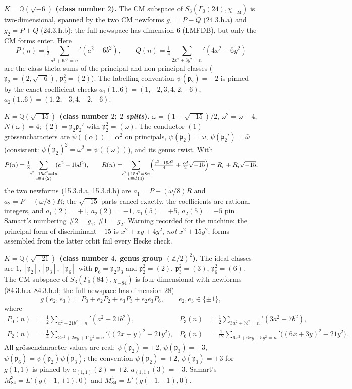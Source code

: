 \documentclass[11pt]{article}
\newcommand{\Qq}{\mathbb{Q}}
\newcommand{\Zz}{\mathbb{Z}}
\theoremstyle{definition}
\theoremstyle{remark}
\begin{document}
\textbf{$K=\Qq(\sqrt{-6})$ (class number $2$).}
The CM subspace of $S_3(\Gamma_0(24),\chi_{-24})$ is
two-dimensional, spanned by the two
CM newforms $g_1=P-Q$ (\textsf{24.3.h.a}) and $g_2=P+Q$
(\textsf{24.3.h.b}); the full newspace has dimension $6$
(LMFDB), but only the CM forms enter. Here
\[
  P(n)=\tfrac12{\sum_{a^2+6b^2=n}}'(a^2-6b^2),\qquad
  Q(n)=\tfrac14{\sum_{2x^2+3y^2=n}}'(4x^2-6y^2)
\]
are the class theta sums of the principal and non-principal classes
($\mathfrak p_2=(2,\sqrt{-6})$, $\mathfrak p_2^2=(2)$). The labelling
convention $\psi(\mathfrak p_2)=-2$ is pinned by the exact coefficient
checks $a_1(1..6)=(1,-2,3,4,2,-6)$, $a_2(1..6)=(1,2,-3,4,-2,-6)$.

\textbf{$K=\Qq(\sqrt{-15})$ (class number $2$; $2$ \emph{splits}).}
$\omega=(1+\sqrt{-15})/2$, $\omega^2=\omega-4$, $N(\omega)=4$;
$(2)=\mathfrak p_2\mathfrak p_2'$ with
$\mathfrak p_2^2=(\omega)$. The conductor-$(1)$ grössencharacters are
$\psi((\alpha))=\alpha^2$ on principals, $\psi(\mathfrak p_2)=\omega$,
$\psi(\mathfrak p_2')=\bar\omega$ (consistent:
$\psi(\mathfrak p_2)^2=\omega^2=\psi((\omega))$), and its genus twist.
With
\[
  P(n)=\tfrac18\!\!\sum_{\substack{c^2+15d^2=4n\\ c\equiv d\,(2)}}\!\!(c^2-15d^2),
  \qquad
  R(n)=\!\!\sum_{\substack{c^2+15d^2=8n\\ c\equiv d\,(4)}}
        \Bigl(\tfrac{c^2-15d^2}{4}+\tfrac{cd}{2}\sqrt{-15}\Bigr)
  =R_r+R_i\sqrt{-15},
\]
the two newforms (\textsf{15.3.d.a}, \textsf{15.3.d.b}) are
$a_1=P+(\bar\omega/8)R$ and $a_2=P-(\bar\omega/8)R$; the $\sqrt{-15}$
parts cancel exactly, the coefficients are rational integers, and
$a_1(2)=+1$, $a_2(2)=-1$, $a_1(5)=+5$, $a_2(5)=-5$ pin Samart's
numbering $\#2=g_1$, $\#1=g_2$. Warning recorded for the machine: the
principal form of discriminant $-15$ is $x^2+xy+4y^2$, \emph{not}
$x^2+15y^2$; forms assembled from the latter orbit fail every Hecke
check.

\textbf{$K=\Qq(\sqrt{-21})$ (class number $4$, genus group
$(\Zz/2)^2$).} The ideal classes are $1,[\mathfrak p_2],
[\mathfrak p_3],[\mathfrak p_6]$ with $\mathfrak p_6=\mathfrak
p_2\mathfrak p_3$ and $\mathfrak p_2^2=(2)$, $\mathfrak p_3^2=(3)$,
$\mathfrak p_6^2=(6)$. The CM subspace of
$S_3(\Gamma_0(84),\chi_{-84})$ is four-dimensional with newforms
(\textsf{84.3.h.a}--\textsf{84.3.h.d}; the full newspace has
dimension $28$)
\[
  g(e_2,e_3)=P_0+e_2P_2+e_3P_3+e_2e_3P_6,\qquad e_2,e_3\in\{\pm1\},
\]
where
\begin{align*}
  P_0(n)&=\tfrac12{\sum_{a^2+21b^2=n}}'(a^2-21b^2),&
  P_3(n)&=\tfrac12{\sum_{3a^2+7b^2=n}}'(3a^2-7b^2),\\
  P_2(n)&=\tfrac14{\sum_{2x^2+2xy+11y^2=n}}'\bigl((2x+y)^2-21y^2\bigr),&
  P_6(n)&=\tfrac1{12}{\sum_{6x^2+6xy+5y^2=n}}'\bigl((6x+3y)^2-21y^2\bigr).
\end{align*}
All grössencharacter values are real: $\psi(\mathfrak p_2)=\pm2$,
$\psi(\mathfrak p_3)=\pm3$, $\psi(\mathfrak p_6)=\psi(\mathfrak
p_2)\psi(\mathfrak p_3)$; the convention $\psi(\mathfrak p_2)=+2$,
$\psi(\mathfrak p_3)=+3$ for $g(1,1)$ is pinned by
$a_{(1,1)}(2)=+2$, $a_{(1,1)}(3)=+3$. Samart's
$M_{84}^3=L'(g(-1,+1),0)$ and $M_{84}^4=L'(g(-1,-1),0)$.
\end{document}
